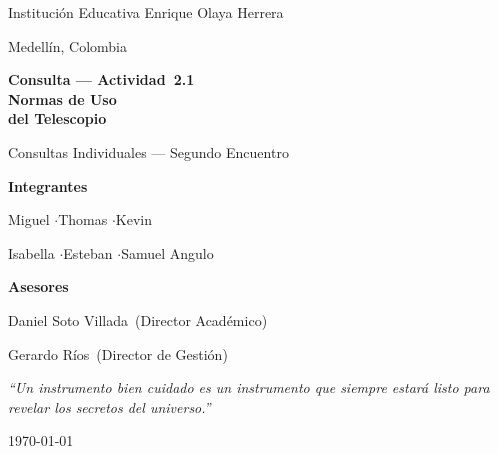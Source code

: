 \documentclass[12pt,oneside]{book}
\newcommand{\Institucion}{Institución Educativa Enrique Olaya Herrera}
\newcommand{\Ciudad}{Medellín, Colombia}
\newcommand{\AsesorPrincipal}{Daniel Soto Villada}
\newcommand{\CoAsesor}{Gerardo Ríos}
\newcommand{\TituloDocumento}{Consulta — Actividad~2.1\\[0.4em]Normas de Uso\\[0.2em]del Telescopio}
\begin{document}
\hypersetup{pageanchor=false}

\begin{titlepage}
    \centering
    \vspace*{1.5cm}

    {\Large\textcolor{grisSec}{\Institucion}\par}
    \vspace{0.2cm}
    {\large\textcolor{grisSec}{\Ciudad}\par}

    \vspace{2.0cm}

    {\Huge\bfseries\textcolor{azulCosmos}{\TituloDocumento}\par}
    \vspace{0.5cm}
    {\Large\textcolor{grisSec}{Consultas Individuales — Segundo Encuentro}\par}

    \vspace{2.4cm}

    \begin{tcolorbox}[
        colback=grisClaro,
        colframe=azulCosmos,
        boxrule=0.9pt,
        arc=2mm,
        width=0.82\textwidth
    ]
        \centering
        {\large\bfseries\textcolor{azulCosmos}{Integrantes}\par}
        \vspace{0.3cm}
        {\normalsize Miguel \quad$\cdot$\quad Thomas \quad$\cdot$\quad Kevin\par}
        \vspace{0.1cm}
        {\normalsize Isabella \quad$\cdot$\quad Esteban \quad$\cdot$\quad Samuel Angulo\par}
        \vspace{0.4cm}
        {\large\bfseries\textcolor{azulCosmos}{Asesores}\par}
        \vspace{0.2cm}
        {\large \AsesorPrincipal\ \textcolor{grisSec}{(Director Académico)}\par}
        \vspace{0.1cm}
        {\large \CoAsesor\ \textcolor{grisSec}{(Director de Gestión)}\par}
    \end{tcolorbox}

    \vspace{1.6cm}

    \begin{tcolorbox}[
        colback=colorIdea,
        colframe=doradoEstrella,
        boxrule=0.7pt,
        arc=2mm,
        width=0.82\textwidth
    ]
        \centering
        \itshape\large\textcolor{grisTexto}{%
        ``Un instrumento bien cuidado es un instrumento que siempre estará listo
        para revelar los secretos del universo.''}
    \end{tcolorbox}

    \vfill
    {\large\textcolor{grisSec}{\today}\par}
    \vspace{0.5cm}
\end{titlepage}
\end{document}
